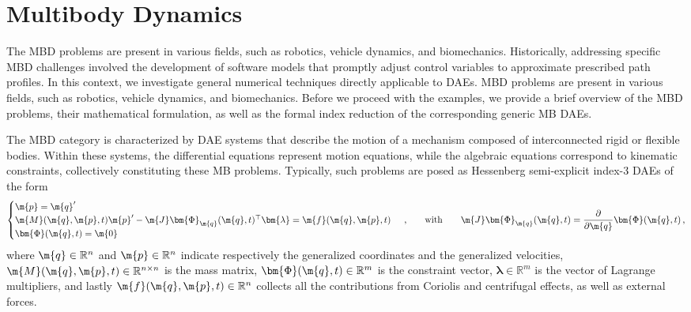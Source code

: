 \section{Multibody Dynamics}
\label{chap4:sec:mbd}

The \ac{MBD} problems are present in various fields, such as robotics, vehicle dynamics, and biomechanics. Historically, addressing specific \ac{MBD} challenges involved the development of software models that promptly adjust control variables to approximate prescribed path profiles. In this context, we investigate general numerical techniques directly applicable to \acp{DAE}. \ac{MBD} problems are present in various fields, such as robotics, vehicle dynamics, and biomechanics. Before we proceed with the examples, we provide a brief overview of the \ac{MBD} problems, their mathematical formulation, as well as the formal index reduction of the corresponding generic \ac{MB} \acp{DAE}.

The \ac{MBD} category is characterized by \ac{DAE} systems that describe the motion of a mechanism composed of interconnected rigid or flexible bodies. Within these systems, the differential equations represent motion equations, while the algebraic equations correspond to kinematic constraints, collectively constituting these \ac{MB} problems. Typically, such problems are posed as Hessenberg semi-explicit index-3 \acp{DAE} of the form
%
\begin{equation}
  \begin{cases}
    \m{p} = \m{q}^{\prime} \\
    \m{M}(\m{q}, \m{p}, t)\m{p}^{\prime} - \m{J}\bm{\Phi}_{\m{q}}(\m{q}, t)^{\top}\bm{\lambda} = \m{f}(\m{q}, \m{p} ,t) \\
    \bm{\Phi}(\m{q}, t) = \m{0}
  \end{cases} \, \text{,}
  \qquad \text{with} \qquad \m{J}\bm{\Phi}_{\m{q}}(\m{q}, t) = \dfrac{\partial}{\partial\m{q}}\bm{\Phi}(\m{q}, t)
  \, \text{,}
  \label{chap4:eq:mbd_fo}
\end{equation}
%
where $\m{q} \in \mathbb{R}^{n}$ and $\m{p} \in \mathbb{R}^{n}$ indicate respectively the generalized coordinates and the generalized velocities, $\m{M}(\m{q}, \m{p}, t) \in \mathbb{R}^{n\times n}$ is the mass matrix, $\bm{\Phi}(\m{q}, t) \in \mathbb{R}^{m}$ is the constraint vector, $\bm{\lambda} \in \mathbb{R}^{m}$ is the vector of Lagrange multipliers, and lastly $\m{f}(\m{q}, \m{p}, t) \in \mathbb{R}^{n}$ collects all the contributions from Coriolis and centrifugal effects, as well as external forces.

